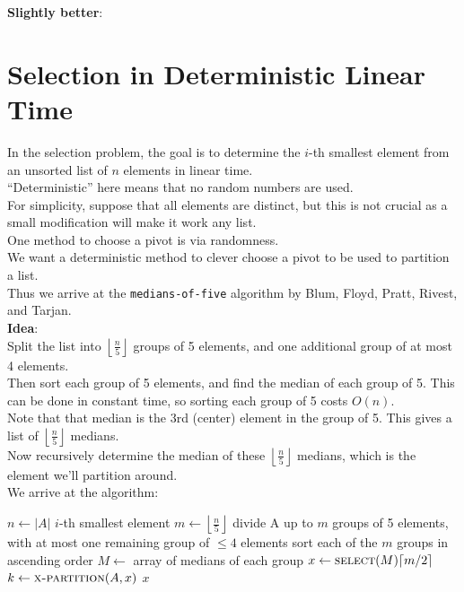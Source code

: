 \documentclass[12pt]{article}
\theoremstyle{plain}
\theoremstyle{definition}
\newcommand{\lecture}[1]{\marginpar{{\footnotesize $\leftarrow$ \underline{#1}}}}
\newcommand{\floor}[1]{\ensuremath{\left\lfloor #1 \right\rfloor}}
\newcommand{\ceil}[1]{\ensuremath{\left\lceil #1 \right\rceil}}
\begin{document}
\textbf{Slightly better}: \\


\newpage
\section{Selection in Deterministic Linear Time}
\lecture{2016/10/25}
In the selection problem, the goal is to determine the $i$-th smallest element from an unsorted list of $n$ elements in linear time. \\
``Deterministic'' here means that no random numbers are used. \\
For simplicity, suppose that all elements are distinct, but this is not crucial as a small modification will make it work any list. \\

One method to choose a pivot is via randomness. \\
We want a deterministic method to clever choose a pivot to be used to partition a list. \\
Thus we arrive at the \texttt{medians-of-five} algorithm by Blum, Floyd, Pratt, Rivest, and Tarjan. \\

\textbf{Idea}: \\
Split the list into $\floor{\frac{n}{5}}$ groups of 5 elements, and one additional group of at most 4 elements. \\
Then sort each group of 5 elements, and find the median of each group of 5.
This can be done in constant time, so sorting each group of 5 costs $O(n)$. \\
Note that that median is the 3rd (center) element in the group of 5.
This gives a list of $\floor{\frac{n}{5}}$ medians. \\
Now recursively determine the median of these $\floor{\frac{n}{5}}$ medians, which is the element we'll partition around. \\

We arrive at the algorithm:
\begin{algorithmic}
  \State $n \gets |A|$
    \State {}
    \State \Return $i$-th smallest element
  \Else
    \State $m \gets \floor{\frac{n}{5}}$
    \State divide A up to $m$ groups of 5 elements, with at most one remaining group of $\leq 4$ elements
    \State sort each of the $m$ groups in ascending order
    \State $M \gets$ array of medians of each group
    \State $x \gets \Call{select}{M}{\ceil{m/2}}$
    \State $k \gets \Call{x-partition}{A, x}$
      \State \Return $x$
      \State \Return {}
    \Else
      \State \Return {}
    \EndIf
  \EndIf
\EndFunction
\end{algorithmic}
\end{document}

